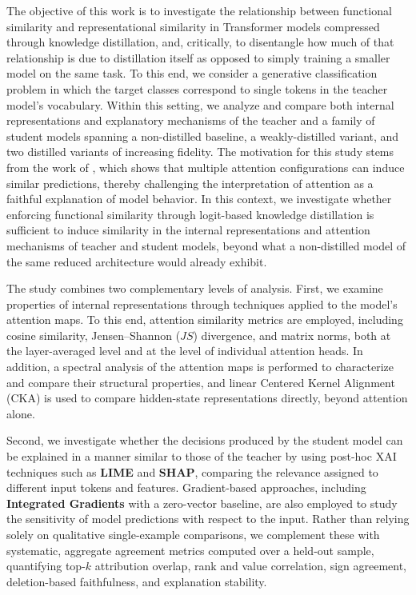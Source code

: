 \documentclass[conference]{IEEEtran}
\begin{document}
The objective of this work is to investigate the relationship between functional similarity and representational similarity in Transformer models compressed through knowledge distillation, and, critically, to disentangle how much of that relationship is due to distillation itself as opposed to simply training a smaller model on the same task. To this end, we consider a generative classification problem \cite{daillm} in which the target classes correspond to single tokens in the teacher model's vocabulary. Within this setting, we analyze and compare both internal representations and explanatory mechanisms of the teacher and a family of student models spanning a non-distilled baseline, a weakly-distilled variant, and two distilled variants of increasing fidelity. The motivation for this study stems from the work of \cite{jain2019attention}, which shows that multiple attention configurations can induce similar predictions, thereby challenging the interpretation of attention as a faithful explanation of model behavior. In this context, we investigate whether enforcing functional similarity through logit-based knowledge distillation is sufficient to induce similarity in the internal representations and attention mechanisms of teacher and student models, beyond what a non-distilled model of the same reduced architecture would already exhibit.

The study combines two complementary levels of analysis. First, we examine properties of internal representations through techniques applied to the model's attention maps. To this end, attention similarity metrics are employed, including cosine similarity, Jensen--Shannon ($JS$) divergence, and matrix norms, both at the layer-averaged level and at the level of individual attention heads. In addition, a spectral analysis of the attention maps is performed to characterize and compare their structural properties, and linear Centered Kernel Alignment (CKA) is used to compare hidden-state representations directly, beyond attention alone.

Second, we investigate whether the decisions produced by the student model can be explained in a manner similar to those of the teacher by using post-hoc XAI techniques such as \textbf{LIME} and \textbf{SHAP}, comparing the relevance assigned to different input tokens and features. Gradient-based approaches, including \textbf{Integrated Gradients} with a zero-vector baseline, are also employed to study the sensitivity of model predictions with respect to the input. Rather than relying solely on qualitative single-example comparisons, we complement these with systematic, aggregate agreement metrics computed over a held-out sample, quantifying top-$k$ attribution overlap, rank and value correlation, sign agreement, deletion-based faithfulness, and explanation stability.
\end{document}
